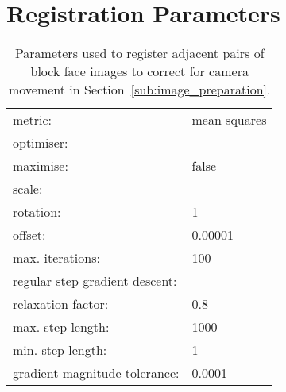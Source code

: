 \appendix
\dblspace

\chapter{Registration Parameters} %
\label{cha:registration_parameters}
  \begin{table}[h]
    \centering
    \begin{tabular}{|ll|}
      \hline
      metric: & mean squares \\
      \multicolumn{2}{|l|}{optimiser:} \\
      \quad maximise: & false\\
      \multicolumn{2}{|l|}{\quad scale:} \\
      \quad\quad rotation: & 1 \\
      \quad\quad offset: & 0.00001 \\
      \quad max. iterations: & 100 \\
      \multicolumn{2}{|l|}{\quad regular step gradient descent:} \\
      \quad\quad relaxation factor: & 0.8 \\
      \quad\quad max. step length: & 1000 \\
      \quad\quad min. step length: & 1 \\
      \quad\quad gradient magnitude tolerance: & 0.0001 \\
      \hline
    \end{tabular}
      
    \caption{Parameters used to register adjacent pairs of block face images to correct for camera movement in Section~\ref{sub:image_preparation}.}
    \label{tab:block_face_to_block_face}
  \end{table}
  
